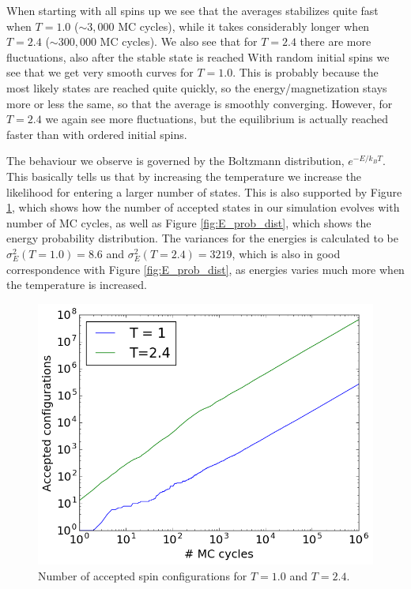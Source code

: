\documentclass[12pt, a4paper]{article}
\begin{document}
When starting with all spins up we see that the averages stabilizes quite fast when $T=1.0$ 
($\sim 3,000$ MC cycles), while it takes considerably longer when $T=2.4$ ($\sim 300,000$ MC cycles).
We also see that for $T=2.4$ there are more fluctuations, also after the stable state is reached
With random initial spins we see that we get very smooth curves for $T=1.0$. This is probably because 
the most likely states are reached quite quickly, so the energy/magnetization stays more or less the 
same, so that the average is smoothly converging. However, for $T=2.4$ we again see more fluctuations, 
but the equilibrium is actually reached faster than with ordered initial spins. 

The behaviour we observe is governed by the Boltzmann distribution, $e^{-E/k_BT}$. This basically tells 
us that by increasing the temperature we increase the likelihood for entering a larger number of 
states. This is also supported by Figure \ref{fig:Acc_confs}, which shows how the number of accepted 
states in our simulation evolves with number of MC cycles, as well as Figure \ref{fig:E_prob_dist}, 
which shows the energy probability distribution. The variances for the energies is calculated to 
be $\sigma_E^2(T=1.0)=8.6$ and $\sigma_E^2(T=2.4)=3219$, which is also in good correspondence with 
Figure \ref{fig:E_prob_dist}, as energies varies much more when the temperature is increased.     

\begin{figure}
\begin{center}
\includegraphics[scale=0.5]{../Programs/Output/Accepted_configurations.png}
\caption{Number of accepted spin configurations for $T=1.0$ and $T=2.4$.}
\label{fig:Acc_confs}
\end{center}
\end{figure}
\end{document}
